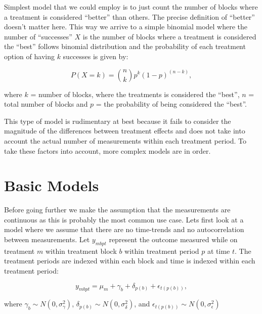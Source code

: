\documentclass[12pt,a4paper,leqno]{report}
\theoremstyle{plain}
\theoremstyle{definition}
\theoremstyle{remark}
\begin{document}
Simplest model that we could employ is to just count the number of blocks where
a treatment is considered ``better'' than others. The precise definition of
``better'' doesn't matter here. This way we arrive to a simple binomial model
where the number of ``successes'' \(X\) is the number of blocks where a
treatment is considered the ``best'' follows binomial distribution and the
probability of each treatment option of having \(k\) successes is given by:

\begin{def}\label{}
    \begin{equation}
        P(X = k) = {n\choose k}p^k{(1-p)}^{(n-k)},
    \end{equation}
\end{def}where \(k\) = number of blocks, where the treatments is considered the
``best'', \(n\) = total number of blocks and \(p\) = the probability of being
considered the ``best''.

This type of model is rudimentary at best because it fails to consider the
magnitude of the differences between treatment effects and does not take into
account the actual number of measurements within each treatment period. To take
these factors into account, more complex models are in order.

\section{Basic Models}\label{conti}

Before going further we make the assumption that the measurements are continuous
as this is probably the most common use case. Lets first look at a model where
we assume that there are no time-trends and no autocorrelation between
measurements. Let \(y_{mbpt}\) represent the outcome measured while on treatment
\(m\) within treatment block \(b\) within treatment period \(p\) at time \(t\).
The treatment periods are indexed within each block and time is indexed within
each treatment period:

\begin{def}\label{}
    \begin{equation}\label{allerrors}
        y_{mbpt} = \mu_m + \gamma_b + \delta_{p(b)} + \epsilon_{t(p(b))},
    \end{equation}
\end{def}where \(\gamma_b \sim N(0,\sigma^2_{\gamma})\), \(\delta_{p(b)} \sim
N(0,\sigma^2_{\delta})\), and \(\epsilon_{t(p(b))} \sim
N(0,\sigma^2_{\epsilon})\)
\end{document}
